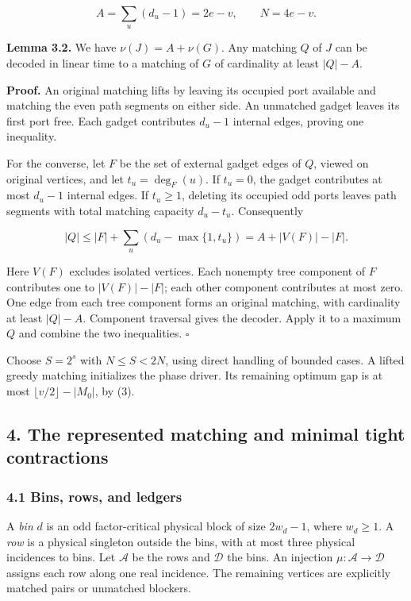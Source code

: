\[
A=\sum_u(d_u-1)=2e-v,\qquad N=4e-v.
 \tag{3}
\]

\textbf{Lemma 3.2.} We have \(\nu(J)=A+\nu(G)\). Any matching \(Q\) of \(J\) can be decoded in linear time to a matching of \(G\) of cardinality at least \(|Q|-A\).

\textbf{Proof.} An original matching lifts by leaving its occupied port available and matching the even path segments on either side. An unmatched gadget leaves its first port free. Each gadget contributes \(d_u-1\) internal edges, proving one inequality.

For the converse, let \(F\) be the set of external gadget edges of \(Q\), viewed on original vertices, and let \(t_u=\deg_F(u)\). If \(t_u=0\), the gadget contributes at most \(d_u-1\) internal edges. If \(t_u\geq1\), deleting its occupied odd ports leaves path segments with total matching capacity \(d_u-t_u\). Consequently

\[
|Q|\leq |F|+\sum_u(d_u-\max\{1,t_u\})
       =A+|V(F)|-|F|.
 \tag{4}
\]

Here \(V(F)\) excludes isolated vertices. Each nonempty tree component of \(F\) contributes one to \(|V(F)|-|F|\); each other component contributes at most zero. One edge from each tree component forms an original matching, with cardinality at least \(|Q|-A\). Component traversal gives the decoder. Apply it to a maximum \(Q\) and combine the two inequalities. \hfill\(\square\)

Choose \(S=2^s\) with \(N\leq S<2N\), using direct handling of bounded cases. A lifted greedy matching initializes the phase driver. Its remaining optimum gap is at most \(\lfloor v/2\rfloor-|M_0|\), by (3).

\hypertarget{af-46593eb93e-the-represented-matching-and-minimal-tight-contractions}{%
\subsection{4. The represented matching and minimal tight contractions}\label{af-46593eb93e-the-represented-matching-and-minimal-tight-contractions}}

\hypertarget{af-46593eb93e-bins-rows-and-ledgers}{%
\subsubsection{4.1 Bins, rows, and ledgers}\label{af-46593eb93e-bins-rows-and-ledgers}}

A \emph{bin} \(d\) is an odd factor-critical physical block of size \(2w_d-1\), where \(w_d\geq1\). A \emph{row} is a physical singleton outside the bins, with at most three physical incidences to bins. Let \(\mathcal A\) be the rows and \(\mathcal D\) the bins. An injection \(\mu:\mathcal A\to\mathcal D\) assigns each row along one real incidence. The remaining vertices are explicitly matched pairs or unmatched blockers.

